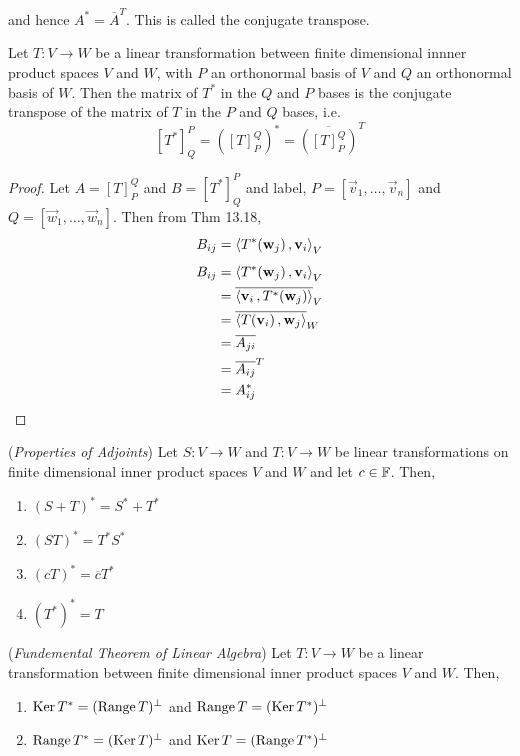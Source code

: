 \documentclass{article}
\begin{document}
and hence $A^* = \overline{A}^T$. This is called the conjugate transpose.

\begin{nthm}
  Let $T : V \to W$ be a linear transformation between finite dimensional innner product spaces $V$ and $W$, with $P$
 an orthonormal basis of $V$ and $Q$ an orthonormal basis of $W$. Then the matrix of $T^*$ in the $Q$ and $P$ bases is the conjugate transpose of the matrix of $T$ in the $P$ and $Q$ bases, i.e.
 $$ [T^*]_Q^{P} = ([T]_P^Q)^* = \overline{([T]_P^Q)}^T $$
\end{nthm}

\begin{proof}
  Let $A = [T]_P^Q$ and $B = [T^*]_Q^P$ and label, $P = [\vec v_1, \dots, \vec v_n]$ and $Q = [\vec w_1, \dots, \vec w_n]$. Then from Thm 13.18,
  $$ B_{ij} = \left\langle T^*(\boldsymbol{\mathbf{w}}_j)\,, \boldsymbol{\mathbf{v}}_i \right\rangle_V $$
  \begin{align*}
    B_{ij} &= \left\langle T^*(\boldsymbol{\mathbf{w}}_j)\,, \boldsymbol{\mathbf{v}}_i \right\rangle_V\\
    &= \overline{\left\langle \boldsymbol{\mathbf{v}}_i\,, T^*(\boldsymbol{\mathbf{w}}_j) \right\rangle}_V\\
    &= \overline{\left\langle T(\boldsymbol{\mathbf{v}}_i)\,, \boldsymbol{\mathbf{w}}_j \right\rangle}_W\\
    &= \overline{A_{ji}}\\
    &= \overline{A_{ij}}^T\\
    &= A_{ij}^*
  \end{align*}
\end{proof}

\begin{nthm}{(\textit{Properties of Adjoints})}
  Let $S : V \to W$ and $T : V \to W$ be linear transformations on finite dimensional inner product spaces $V$ and $W$ and let $c\in \mathbb{F}$. Then,
  \begin{enumerate}
    \item $(S + T)^* = S^* + T^*$
    \item $(ST)^* = T^*S^*$
    \item $(cT)^* = \overline{c}T^*$
    \item $(T^*)^* = T$
  \end{enumerate}
\end{nthm}

\begin{nthm}{(\textit{Fundemental Theorem of Linear Algebra})}
  Let $T : V \to W$ be a linear transformation between finite dimensional inner product spaces $V$ and $W$. Then,
  \begin{enumerate}
    \item $\operatorname{Ker} T^* = (\operatorname{Range} T)^\bot$ and $\operatorname{Range} T = (\operatorname{Ker} T^*)^\bot$
    \item $\operatorname{Range} T^* = (\operatorname{Ker} T)^\bot$ and $\operatorname{Ker} T = (\operatorname{Range} T^*)^\bot$
  \end{enumerate}
\end{nthm}
\end{document}
